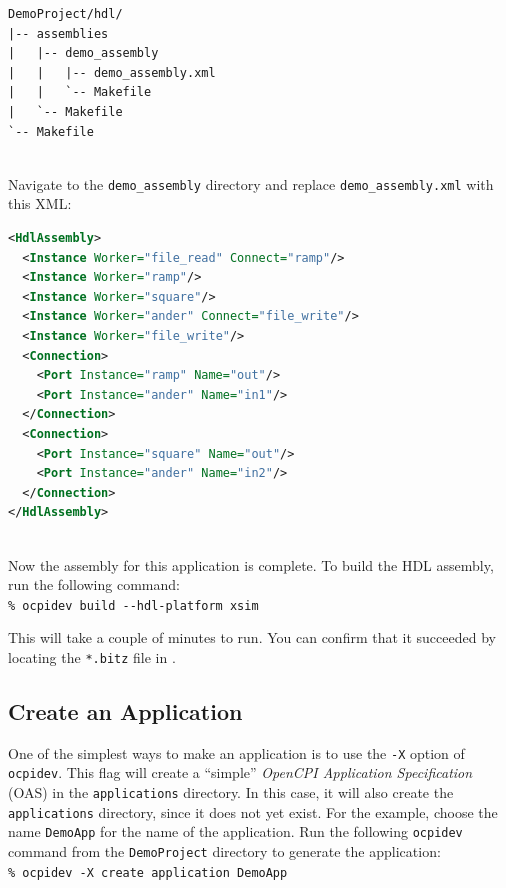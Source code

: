\begin{verbatim}
DemoProject/hdl/
|-- assemblies
|   |-- demo_assembly
|   |   |-- demo_assembly.xml
|   |   `-- Makefile
|   `-- Makefile
`-- Makefile
\end{verbatim}
\bend
\pagebreak[1]
~\\
\label{example:assembly}
Navigate to the \verb+demo_assembly+ directory and replace \verb+demo_assembly.xml+ with this XML:
\begin{lstlisting}[language=xml]
<HdlAssembly>
  <Instance Worker="file_read" Connect="ramp"/>
  <Instance Worker="ramp"/>
  <Instance Worker="square"/>
  <Instance Worker="ander" Connect="file_write"/>
  <Instance Worker="file_write"/>
  <Connection>
    <Port Instance="ramp" Name="out"/>
    <Port Instance="ander" Name="in1"/>
  </Connection>
  <Connection>
    <Port Instance="square" Name="out"/>
    <Port Instance="ander" Name="in2"/>
  </Connection>
</HdlAssembly>
\end{lstlisting}
~\\
\label{example:buildasms}
Now the assembly for this application is complete. To build the HDL assembly, run the following command:\\

\forceindent\verb+% ocpidev build --hdl-platform xsim+\\
\OcpidevBuild

This will take a couple of minutes to run. You can confirm that it succeeded by locating the \texttt{*.bitz} file in .\\
\subsection{Create an Application}
One of the simplest ways to make an application is to use the \verb+-X+ option of \verb+ocpidev+. This flag will create a ``simple'' \textit{OpenCPI Application Specification} (OAS) in the \verb+applications+ directory. In this case, it will also create the \verb+applications+ directory, since it does not yet exist. For the example, choose the name \verb+DemoApp+ for the name of the application. Run the following \verb+ocpidev+ command from the \verb+DemoProject+ directory to generate the application:\\

\forceindent\verb+% ocpidev -X create application DemoApp+\\
\OcpidevCreate{}

